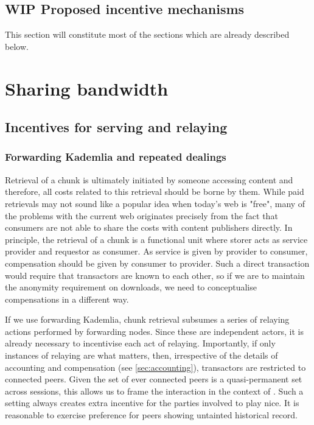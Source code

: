 \subsection{WIP Proposed incentive mechanisms}\label{sec:incentive_mechanisms}
This section will constitute most of the sections which are already described below.


\section{Sharing bandwidth}

\green{}

\subsection{Incentives for serving and relaying}\label{sec:incentives-relaying}

\green{}

\subsubsection{Forwarding Kademlia and repeated dealings}

Retrieval of a chunk is ultimately initiated by someone accessing content and therefore, all costs related to this retrieval should be borne by them. While paid retrievals may not sound like a popular idea when today's web is "free", many of the problems with the current web originates precisely from the fact that consumers are not able to share the costs with content publishers directly. In principle, the retrieval of a chunk is a functional unit where storer acts as service provider and requestor as consumer. As service is given by provider to consumer, compensation should be given by consumer to provider. Such a direct transaction would require that transactors are known to each other, so if we are to maintain the anonymity requirement on  downloads, we need to conceptualise compensations in a different way. 

If we use forwarding Kademlia, chunk retrieval subsumes a series of relaying actions performed by forwarding nodes. Since these are independent actors, it is already necessary to incentivise each act of relaying. Importantly, if only instances of relaying are what matters, then, irrespective of the details of accounting and compensation (see \ref{sec:accounting}), transactors are restricted to connected peers. Given the set of ever connected peers is a quasi-permanent set across sessions, this allows us to frame the interaction in the context of . Such a setting always creates extra incentive for the parties involved to play nice. It is reasonable to exercise preference for peers showing untainted historical record. 

